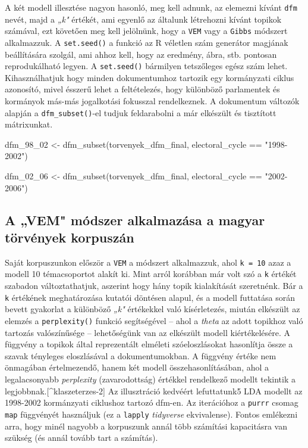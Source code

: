 \documentclass[
]{book}
\newenvironment{Shaded}{\begin{snugshade}}{\end{snugshade}}
\newcommand{\FunctionTok}[1]{\textcolor[rgb]{0.00,0.00,0.00}{#1}}
\newcommand{\NormalTok}[1]{#1}
\newcommand{\OtherTok}[1]{\textcolor[rgb]{0.56,0.35,0.01}{#1}}
\newcommand{\SpecialCharTok}[1]{\textcolor[rgb]{0.00,0.00,0.00}{#1}}
\newcommand{\StringTok}[1]{\textcolor[rgb]{0.31,0.60,0.02}{#1}}
\begin{document}
A két modell illesztése nagyon hasonló, meg kell adnunk, az elemezni
kívánt \texttt{dfm} nevét, majd a \emph{„k"} értékét, ami egyenlő az
általunk létrehozni kívánt topikok számával, ezt követően meg kell
jelölnünk, hogy a \texttt{VEM} vagy a \texttt{Gibbs} módszert
alkalmazzuk. A \texttt{set.seed()} a funkció az R véletlen szám
generátor magjának beállítására szolgál, ami ahhoz kell, hogy az
eredmény, ábra, stb. pontosan reprodukálható legyen. A
\texttt{set.seed()} bármilyen tetszőleges egész szám lehet.
Kihasználhatjuk hogy minden dokumentumhoz tartozik egy kormányzati
ciklus azonosító, mivel ésszerű lehet a feltételezés, hogy különböző
parlamentek és kormányok más-más jogalkotási fokusszal rendelkeznek. A
dokumentum változók alapján a \texttt{dfm\_subset()}-el tudjuk
feldarabolni a már elkészült és tisztított mátrixunkat.

\begin{Shaded}
\begin{Highlighting}[]
\NormalTok{dfm\_98\_02 }\OtherTok{\textless{}{-}} \FunctionTok{dfm\_subset}\NormalTok{(torvenyek\_dfm\_final, electoral\_cycle }\SpecialCharTok{==} \StringTok{"1998{-}2002"}\NormalTok{)}

\NormalTok{dfm\_02\_06 }\OtherTok{\textless{}{-}} \FunctionTok{dfm\_subset}\NormalTok{(torvenyek\_dfm\_final, electoral\_cycle }\SpecialCharTok{==} \StringTok{"2002{-}2006"}\NormalTok{)}
\end{Highlighting}
\end{Shaded}

\hypertarget{a-vem-muxf3dszer-alkalmazuxe1sa-a-magyar-tuxf6rvuxe9nyek-korpuszuxe1n}{%
\subsection{A „VEM" módszer alkalmazása a magyar törvények
korpuszán}\label{a-vem-muxf3dszer-alkalmazuxe1sa-a-magyar-tuxf6rvuxe9nyek-korpuszuxe1n}}

Saját korpuszunkon először a \texttt{VEM} a módszert alkalmazzuk, ahol
\texttt{k\ =\ 10} azaz a modell 10 témacsoportot alakít ki. Mint arról
korábban már volt szó a \texttt{k} értékét szabadon változtathatjuk,
aszerint hogy hány topik kialakítását szeretnénk. Bár a \texttt{k}
értékének meghatározása kutatói döntésen alapul, és a modell futtatása
során bevett gyakorlat a különböző \emph{„k"} értékekkel való
kísérletezés, miután elkészült az elemzés a \texttt{perplexity()}
funkció segítségével -- ahol a \emph{theta} az adott topikhoz való
tartozás valószínűsége -- lehetőségünk van az elkészült modell
kiértékelésére. A függvény a topikok által reprezentált elméleti
szóeloszlásokat hasonlítja össze a szavak tényleges eloszlásával a
dokumentumokban. A függvény értéke nem önmagában értelmezendő, hanem két
modell összehasonlításában, ahol a legalacsonyabb \emph{perplexity}
(zavarodottság) értékkel rendelkező modellt tekintik a
legjobbnak.{[}\^{}klaszeterzes-2{]} Az illusztráció kedvéért
lefuttatunk5 LDA modellt az 1998-2002 kormánzyati ciklushoz tartozó
dfm-en. Az iterációhoz a \texttt{purrr} csomag \texttt{map} függvényét
használjuk (ez a \texttt{lapply} \emph{tidyverse} ekvivalense). Fontos
emlékezni arra, hogy minél nagyobb a korpuszunk annál több számítási
kapacitásra van szükség (és annál tovább tart a számítás).
\end{document}
